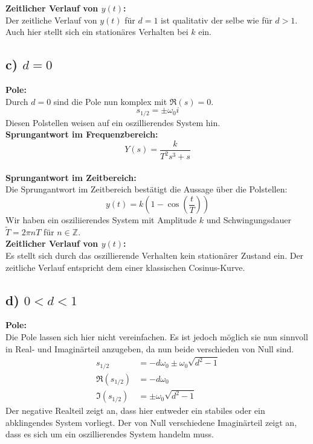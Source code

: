 \documentclass[11pt]{scrartcl} %
\begin{document}
\textbf{Zeitlicher Verlauf von $y(t)$:}\\
Der zeitliche Verlauf von $y(t)$ für $d=1$ ist qualitativ der selbe wie für $d>1$. Auch hier stellt sich ein stationäres Verhalten bei $k$ ein.


\subsection*{c) $d=0$}
\textbf{Pole:}\\
Durch $d=0$ sind die Pole nun komplex mit $\Re(s)=0$.
\begin{equation*}
s_{1/2}=\pm \omega_0 i
\end{equation*}
Diesen Polstellen weisen auf ein oszillierendes System hin.\\

\textbf{Sprungantwort im Frequenzbereich:}\\
\begin{equation*}
Y(s)=\dfrac{k}{T^2s^3+s}
\end{equation*}\\

\textbf{Sprungantwort im Zeitbereich:}\\
Die Sprungantwort im Zeitbereich bestätigt die Aussage über die Polstellen:
\begin{equation*}
y(t)=k \left( 1 - \cos \left( \dfrac{t}{T} \right) \right)
\end{equation*}
Wir haben ein osziliierendes System mit Amplitude $k$ und Schwingungsdauer $\tilde{T}=2\pi n T$ für $n \in \mathbb{Z}$.\\

\textbf{Zeitlicher Verlauf von $y(t)$:}\\
Es stellt sich durch das oszillierende Verhalten kein stationärer Zustand ein. Der zeitliche Verlauf entspricht dem einer klassischen Cosinus-Kurve.


\subsection*{d) $0<d<1$}
\textbf{Pole:}\\
Die Pole lassen sich hier nicht vereinfachen. Es ist jedoch möglich sie nun sinnvoll in Real- und Imaginärteil anzugeben, da nun beide verschieden von Null sind.
\begin{align*}
s_{1/2}&=-d\omega_0\pm\omega_0\sqrt{d^2-1} \\
\Re(s_{1/2})&=-d\omega_0 \\
\Im(s_{1/2})&=\pm\omega_0\sqrt{d^2-1}
\end{align*}
Der negative Realteil zeigt an, dass hier entweder ein stabiles oder ein abklingendes System vorliegt. Der von Null verschiedene Imaginärteil zeigt an, dass es sich um ein oszillierendes System handelm muss.\\
\end{document}
